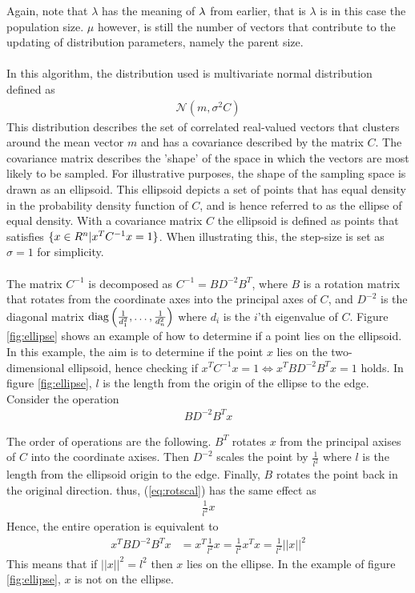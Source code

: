 Again, note that $\lambda$ has the meaning of $\lambda$ from earlier, that
is $\lambda$ is in this case the population size. $\mu$ however, is still the number
of vectors that contribute to the updating of distribution parameters, namely the 
parent size.\\
\\
In this algorithm, the distribution used is multivariate normal distribution defined
as 
\begin{align}
\mathcal{N} \left( m,  \sigma^2 C \right)
\end{align}
This distribution describes the set of correlated real-valued vectors that
clusters around the mean vector $m$ and has a covariance described by the
matrix $C$. The covariance matrix describes the 'shape' of the space in which 
the vectors are most likely to be sampled. For illustrative purposes,
the shape of the sampling space is drawn as an ellipsoid.
This ellipsoid depicts a set of points that has equal density 
in the probability density function of $C$, and is hence referred to 
as the ellipse of equal density.
With a covariance matrix $C$
the ellipsoid is defined as points that satisfies
$\{x \in R^{n} | x^{T} C^{-1} x = 1\}$.
When illustrating this, the step-size is set as $\sigma = 1$ for simplicity.\\
\\
The matrix $C^{-1}$ is decomposed as $C^{-1} = B D^{-2} B^T$, where $B$ is a rotation 
matrix that rotates from the coordinate axes into the principal axes of $C$, and 
$D^{-2}$ is the diagonal matrix 
$\text{diag} \left( \frac{1}{d_{1}^2},\dots, \frac{1}{d_{n}^2} \right)$
where $d_{i}$ is the $i$'th eigenvalue of $C$. Figure \ref{fig:ellipse} shows an example
of how to determine if a point lies on the ellipsoid. In this example, the aim is to 
determine if the point $x$ lies on the two-dimensional ellipsoid, hence checking if 
$x^{T} C^{-1} x = 1 \Leftrightarrow x^{T} B D^{-2} B^T x = 1 $ holds. In figure 
\ref{fig:ellipse}, $l$ is the length from the origin of the ellipse to the edge.
Consider the operation
\begin{align}
B D^{-2} B^T x \label{eq:rotscal}
\end{align}

The order of operations are the following. 
$B^{T}$ rotates $x$ from the principal axises of $C$
into the coordinate axises. Then $D^{-2}$ scales the point by $\frac{1}{l^2}$ where
$l$ is the length from the ellipsoid origin to the edge. Finally, $B$ rotates the point 
back in the original direction. thus, (\ref{eq:rotscal}) has the same effect as
\begin{align}
\frac{1}{l^2} x
\end{align}
Hence, the entire operation is equivalent to
\begin{align}
x^{T} B D^{-2} B^T x &= x^{T} \frac{1}{l^2} x = \frac{1}{l^2} x^{T} x
= \frac{1}{l^2} ||x||^2
\end{align}
This means that if $||x||^2 = l^2$ then $x$ lies on the ellipse.
In the example of figure \ref{fig:ellipse}, $x$ is not 
on the ellipse.



